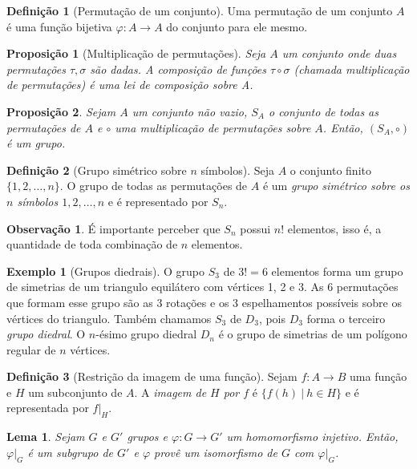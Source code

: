 \documentclass[a4paper,12pt]{report}
\theoremstyle{plain}
\newtheorem{lema}{Lema}[section]
\newtheorem{proposicao}{Proposição}[section]
\theoremstyle{definition}
\newtheorem{definicao}{Definição}[section]
\newtheorem{observacao}{Observação}[section]
\newtheorem{exemplo}{Exemplo}[section]
\begin{document}
\begin{definicao}[Permutação de um conjunto]
		Uma permutação de um conjunto $A$ é uma função bijetiva $\varphi: A \longrightarrow A$ do conjunto para ele mesmo.
\end{definicao}

\begin{proposicao}[Multiplicação de permutações]\label{def:multpermut}
	Seja $A$ um conjunto onde duas permutações $\tau,\sigma$ são dadas. A composição de funções $\tau\circ\sigma$ (chamada \emph{multiplicação de permutações}) é uma lei de composição sobre A.
\end{proposicao}

\begin{proposicao}
	Sejam $A$ um conjunto não vazio, $S_A$ o conjunto de todas as permutações de $A$ e $\circ$ uma multiplicação de permutações sobre $A$. Então, $(S_A, \circ)$ é um grupo.
\end{proposicao}

\begin{definicao}[Grupo simétrico sobre $n$ símbolos]
	Seja $A$ o conjunto finito $\{1,2,\dots, n\}$. O grupo de todas as permutações de $A$ é um \emph{grupo simétrico sobre os $n$ símbolos $1,2,\dots,n$} e é representado por $S_n$.	
\end{definicao}

\begin{observacao}
	É importante perceber que $S_n$ possui $n!$ elementos, isso é, a quantidade de toda combinação de $n$ elementos.
\end{observacao}

\begin{exemplo}[Grupos diedrais]
	O grupo $S_3$ de $3! = 6$ elementos forma um grupo de simetrias de um triangulo equilátero com vértices 1, 2 e 3. As 6 permutações que formam esse grupo são as 3 rotações e os 3 espelhamentos possíveis sobre os vértices do triangulo. Também chamamos $S_3$ de $D_3$, pois $D_3$ forma o terceiro \emph{grupo diedral}. 
	O $n$-ésimo grupo diedral $D_n$ é o grupo de simetrias de um polígono regular de $n$ vértices.
\end{exemplo}

\begin{definicao}[Restrição da imagem de uma função]
	Sejam $f: A\longrightarrow B$ uma função e $H$ um subconjunto de $A$. A \emph{imagem de $H$ por $f$} é $\{f(h)\ |\ h \in H\}$ e é representada por $f|_H$.
\end{definicao}

\begin{lema}
	Sejam $G$ e $G'$ grupos e $\varphi:G\longrightarrow G'$ um homomorfismo injetivo. Então, $\varphi|_G$ é um subgrupo de $G'$ e $\varphi$ provê um isomorfismo de $G$ com $\varphi|_G$.
\end{lema}
\end{document}
